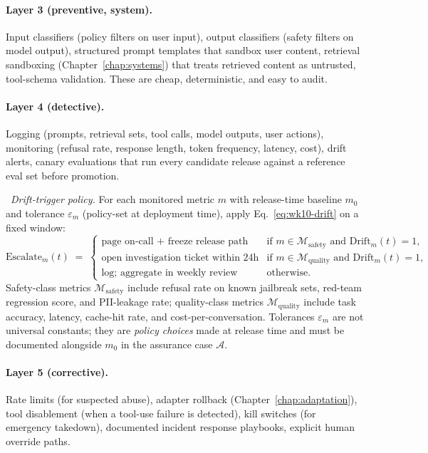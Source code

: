 \paragraph{Layer 3 (preventive, system).} Input classifiers
(policy filters on user input), output classifiers (safety
filters on model output), structured prompt templates that
sandbox user content, retrieval sandboxing (Chapter~\ref{chap:systems}) that treats
retrieved content as untrusted, tool-schema validation. These
are cheap, deterministic, and easy to audit.

\paragraph{Layer 4 (detective).} Logging (prompts, retrieval
sets, tool calls, model outputs, user actions), monitoring
(refusal rate, response length, token frequency, latency,
cost), drift alerts, canary evaluations that run every
candidate release against a reference eval set before promotion.

\Def\ \emph{Drift-trigger policy.} For each monitored metric
$m$ with release-time baseline $m_0$ and tolerance
$\varepsilon_m$ (policy-set at deployment time), apply
Eq.~\eqref{eq:wk10-drift} on a fixed window:
\begin{equation}
  \mathrm{Escalate}_m(t)
  \;=\;
  \begin{cases}
    \text{page on-call + freeze release path}
      & \text{if } m \in \mathcal{M}_\mathrm{safety}
        \text{ and } \mathrm{Drift}_m(t) = 1, \\
    \text{open investigation ticket within 24h}
      & \text{if } m \in \mathcal{M}_\mathrm{quality}
        \text{ and } \mathrm{Drift}_m(t) = 1, \\
    \text{log; aggregate in weekly review}
      & \text{otherwise.}
  \end{cases}
  \label{eq:wk10-escalate}
\end{equation}
Safety-class metrics $\mathcal{M}_\mathrm{safety}$ include refusal
rate on known jailbreak sets, red-team regression score, and
PII-leakage rate; quality-class metrics
$\mathcal{M}_\mathrm{quality}$ include task accuracy, latency,
cache-hit rate, and cost-per-conversation. Tolerances
$\varepsilon_m$ are not universal constants; they are
\emph{policy choices} made at release time and must be
documented alongside $m_0$ in the assurance case $\mathcal{A}$.

\paragraph{Layer 5 (corrective).} Rate limits (for suspected
abuse), adapter rollback (Chapter~\ref{chap:adaptation}), tool disablement (when a
tool-use failure is detected), kill switches (for emergency
takedown), documented incident response playbooks, explicit
human override paths.

